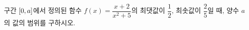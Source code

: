 구간 $[0{,}\mkern3mu\mathopen{}a]$에서 정의된 함수 $f(x)=\dfrac{x+2}{x^2+5}$의 최댓값이 $\dfrac{1}{2}$, 최솟값이 $\dfrac{2}{5}$일 때, 양수 $a$의 값의 범위를 구하시오.
